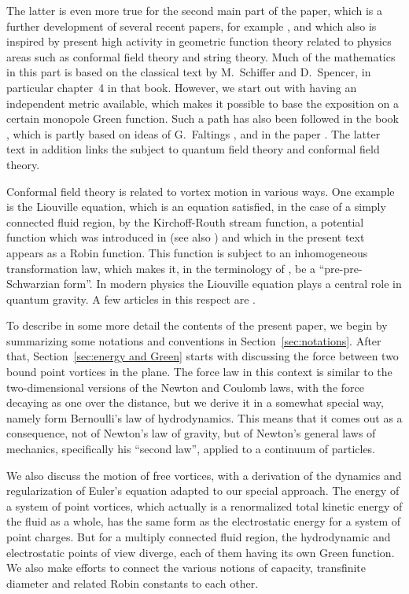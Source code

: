 \documentclass[reqno,12pt]{article}
\theoremstyle{plain}
\theoremstyle{definition}
\numberwithin{equation}{section}
\numberwithin{figure}{section}
\begin{document}
The latter is even more true for the second main part of the paper, which is a further development of several recent papers,
for example  \cite{Grotta-Ragazzo-Gustafsson-Koiller-2024}, and which also is inspired by present high activity
in geometric function theory related to physics areas such as conformal field theory and string theory. 
Much of the mathematics in this part is based on the classical text \cite{Schiffer-Spencer-1954}
by M.~Schiffer and D.~Spencer, in particular chapter~4  in
that book. However, we start out with having an independent metric available, which makes it possible to base the 
exposition on a certain monopole Green function. Such a path has also been followed in the book \cite{Lang-1988},
which is partly based on ideas of G.~Faltings \cite{Faltings-1984}, and in the paper \cite{Takhtajan-2001}.
The latter text in addition links the subject to quantum field theory and conformal field theory.

Conformal field theory is related to vortex motion in various ways. One example is the Liouville equation,
which is an equation satisfied, in the case of a simply connected fluid region, by the Kirchoff-Routh stream function, 
a potential function which was introduced in \cite{Lin-1943} (see also \cite{Lamb-1993}) 
and which in the present text appears as a Robin function. 
This function is subject to an inhomogeneous transformation law, which makes it, in the terminology of
\cite{Kang-Makarov-2013}, be a ``pre-pre-Schwarzian form''.
In modern physics the Liouville equation plays a central role in quantum gravity. A few articles in this respect are 
\cite{Alvarez-1987, Zamolodchikov-2005, Takhtajan-Teo-2006}.

To describe in some more detail the contents of the present paper, we begin by  summarizing
some notations and conventions in  Section~\ref{sec:notations}. 
After that, Section~\ref{sec:energy and Green} starts with discussing  the force between two bound 
point vortices in the plane. 
The force law in this context is similar to the two-dimensional versions of the Newton and Coulomb laws, 
with the force decaying as one over the distance, but we derive it in a somewhat special way,
namely form Bernoulli's law of hydrodynamics. This means that it comes out as a consequence, not
of Newton's law of gravity, but of Newton's general laws of mechanics, specifically his ``second law'', applied to
a continuum of particles.

We also discuss the motion of free vortices, with a derivation of the dynamics and regularization of Euler's 
equation adapted to our special approach. The energy of a system of point vortices, which actually
is a renormalized total kinetic energy of the fluid as a whole, has the same
form as the electrostatic energy for a system of point charges. But for a multiply connected fluid region,
the hydrodynamic and electrostatic points of view diverge, each of them having its own Green function. 
We also make efforts to connect the various notions of capacity, transfinite diameter and 
related Robin constants to each other. 
\end{document}
